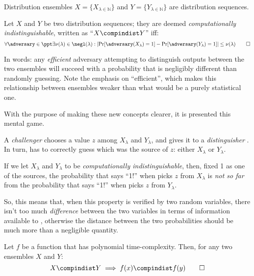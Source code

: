 Distribution ensembles $X = \{X_{\lambda \in \mathbb{N}}\}$ and $Y = \{Y_{\lambda \in \mathbb{N}}\}$ are distribution sequences.

\begin{definition}
    Let $X$ and $Y$ be two distribution sequences; they are deemed \emph{computationally indistinguishable}, written as ``$X \compindist Y$'' iff:
    \[
        \forall \adversary \in \ppt \exists \nu(\lambda) \in \negl(\lambda) : \left|\Pr[\adversary(X_\lambda) = 1] - \Pr[\adversary(Y_\lambda) = 1]\right| \leq \nu(\lambda) \qedhere
    \]
\end{definition}

In words: any \emph{efficient} adversary attempting to distinguish outputs between the two ensembles will succeed with a probability that is negligibly different than randomly guessing. Note the emphasis on ``efficient'', which makes this relationship between ensembles weaker than what would be a purely statistical one.

With the purpose of making these new concepts clearer, it is presented this mental game.


A \emph{challenger} \challenger{} chooses a value $z$ among $X_\lambda$ and $Y_\lambda$, and gives it to a \emph{distinguisher} \distinguisher{}. In turn, \distinguisher{} has to correctly guess which was the source of $z$: either $X_\lambda$ or $Y_\lambda$. 

If we let $X_\lambda$ and $Y_\lambda$ to be \emph{computationally indistinguishable}, then, fixed 1 as one of the sources, the probability that \distinguisher{} says ``1!'' when \challenger{} picks $z$ from $X_\lambda$ is \emph{not so far} from the probability that \distinguisher{} says ``1!'' when \challenger{} picks $z$ from $Y_\lambda$.

So, this means that, when this property is verified by two random variables, there isn't too much \textit{difference} between the two variables in terms of information available to \distinguisher{}, otherwise the distance between the two probabilities should be much more than a negligible quantity.

\begin{lemma} \label{lem:compmall}
    Let $f$ be a function that has polynomial time-complexity. Then, for any two ensembles $X$ and $Y$:
    \[
        X \compindist Y \implies f(x) \compindist f(y) \qedhere
    \]
\end{lemma}

